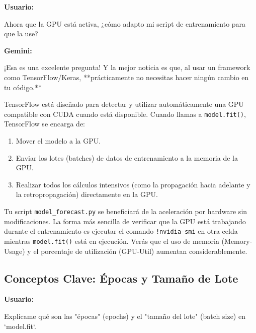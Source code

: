\documentclass[12pt, a4paper]{article}
\newenvironment{usuario}{\par\noindent\textbf{Usuario:}\itshape\par\ignorespaces}{\par}
\newenvironment{gemini}{\par\noindent\textbf{Gemini:}\par\ignorespaces}{\par}
\begin{document}
\begin{usuario}
Ahora que la GPU está activa, ¿cómo adapto mi script de entrenamiento para que la use?
\end{usuario}

\begin{gemini}
¡Esa es una excelente pregunta! Y la mejor noticia es que, al usar un framework como TensorFlow/Keras, **prácticamente no necesitas hacer ningún cambio en tu código.**

TensorFlow está diseñado para detectar y utilizar automáticamente una GPU compatible con CUDA cuando está disponible. Cuando llamas a \texttt{model.fit()}, TensorFlow se encarga de:
\begin{enumerate}
    \item Mover el modelo a la GPU.
    \item Enviar los lotes (batches) de datos de entrenamiento a la memoria de la GPU.
    \item Realizar todos los cálculos intensivos (como la propagación hacia adelante y la retropropagación) directamente en la GPU.
\end{enumerate}

Tu script \texttt{model\_forecast.py} se beneficiará de la aceleración por hardware sin modificaciones. La forma más sencilla de verificar que la GPU está trabajando durante el entrenamiento es ejecutar el comando \texttt{!nvidia-smi} en otra celda mientras \texttt{model.fit()} está en ejecución. Verás que el uso de memoria (Memory-Usage) y el porcentaje de utilización (GPU-Util) aumentan considerablemente.
\end{gemini}

\subsection{Conceptos Clave: Épocas y Tamaño de Lote}

\begin{usuario}
Explícame qué son las "épocas" (epochs) y el "tamaño del lote" (batch size) en `model.fit`.
\end{usuario}
\end{document}
